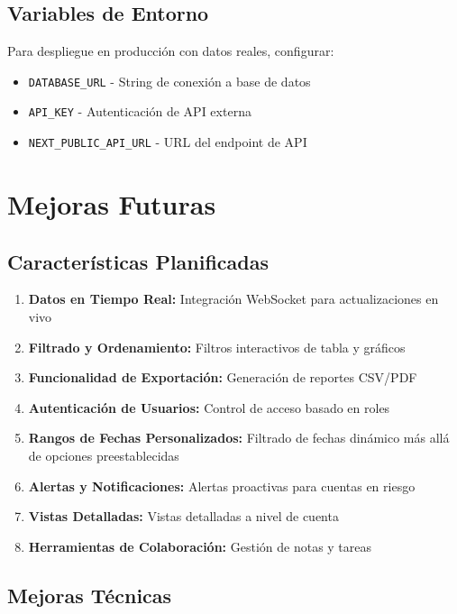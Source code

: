 \documentclass[12pt,a4paper]{article}
\begin{document}
\subsection{Variables de Entorno}

Para despliegue en producción con datos reales, configurar:
\begin{itemize}
    \item \texttt{DATABASE\_URL} - String de conexión a base de datos
    \item \texttt{API\_KEY} - Autenticación de API externa
    \item \texttt{NEXT\_PUBLIC\_API\_URL} - URL del endpoint de API
\end{itemize}

\section{Mejoras Futuras}

\subsection{Características Planificadas}

\begin{enumerate}
    \item \textbf{Datos en Tiempo Real:} Integración WebSocket para actualizaciones en vivo
    \item \textbf{Filtrado y Ordenamiento:} Filtros interactivos de tabla y gráficos
    \item \textbf{Funcionalidad de Exportación:} Generación de reportes CSV/PDF
    \item \textbf{Autenticación de Usuarios:} Control de acceso basado en roles
    \item \textbf{Rangos de Fechas Personalizados:} Filtrado de fechas dinámico más allá de opciones preestablecidas
    \item \textbf{Alertas y Notificaciones:} Alertas proactivas para cuentas en riesgo
    \item \textbf{Vistas Detalladas:} Vistas detalladas a nivel de cuenta
    \item \textbf{Herramientas de Colaboración:} Gestión de notas y tareas
\end{enumerate}

\subsection{Mejoras Técnicas}
\end{document}
